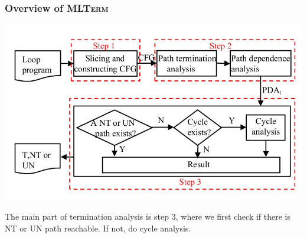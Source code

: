 \documentclass[11pt]{beamer}
\begin{document}
\begin{frame}\frametitle{Overview of \textsc{MLTerm}}

\begin{center}
\includegraphics[scale=0.3]{overview.png}	

\end{center}

The main part of termination analysis is step 3, where we first check if there is NT or UN path reachable. If not, do cycle analysis.
\end{frame}
\end{document}
